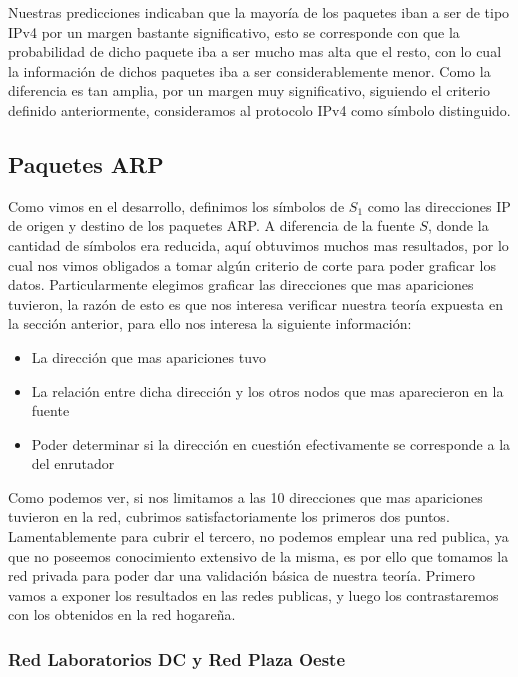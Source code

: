 Nuestras predicciones indicaban que la mayoría de los paquetes iban a ser de tipo IPv4 por un margen bastante significativo, esto se corresponde con que la probabilidad de dicho paquete iba a ser mucho mas alta que el resto, con lo cual la información de dichos paquetes iba a ser considerablemente menor. Como la diferencia es tan amplia, por un margen muy significativo, siguiendo el criterio definido anteriormente, consideramos al protocolo IPv4 como símbolo distinguido.

\pagebreak

\subsection{Paquetes ARP}

Como vimos en el desarrollo, definimos los símbolos de $S_1$ como las direcciones IP de origen y destino de los paquetes ARP. A diferencia de la fuente $S$, donde la cantidad de símbolos era reducida, aquí obtuvimos muchos mas resultados, por lo cual nos vimos obligados a tomar algún criterio de corte para poder graficar los datos. Particularmente elegimos graficar las direcciones que mas apariciones tuvieron, la razón de esto es que nos interesa verificar nuestra teoría expuesta en la sección anterior, para ello nos interesa la siguiente información:

\begin{itemize}
	\item La dirección que mas apariciones tuvo
	\item La relación entre dicha dirección y los otros nodos que mas aparecieron en la fuente
	\item Poder determinar si la dirección en cuestión efectivamente se corresponde a la del enrutador
\end{itemize}

Como podemos ver, si nos limitamos a las 10 direcciones que mas apariciones tuvieron en la red, cubrimos satisfactoriamente los primeros dos puntos. Lamentablemente para cubrir el tercero, no podemos emplear una red publica, ya que no poseemos conocimiento extensivo de la misma, es por ello que tomamos la red privada para poder dar una validación básica de nuestra teoría. Primero vamos a exponer los resultados en las redes publicas, y luego los contrastaremos con los obtenidos en la red hogareña.


\subsubsection{Red Laboratorios DC y Red Plaza Oeste}


